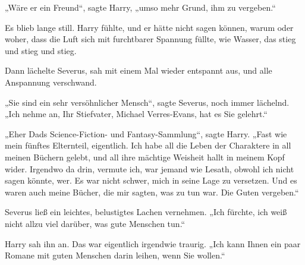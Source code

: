 „Wäre er ein Freund“, sagte Harry, „umso mehr Grund, ihm zu vergeben.“

Es blieb lange still. Harry fühlte, und er hätte nicht sagen können, warum oder woher, dass die Luft sich mit furchtbarer Spannung füllte, wie Wasser, das stieg und stieg und stieg.

Dann lächelte Severus, sah mit einem Mal wieder entspannt aus, und alle Anspannung verschwand.

„Sie sind ein sehr versöhnlicher Mensch“, sagte Severus, noch immer lächelnd.
„Ich nehme an, Ihr Stiefvater, Michael Verres-Evans, hat es Sie gelehrt.“

„Eher Dads Science-Fiction- und Fantasy-Sammlung“, sagte Harry.
„Fast wie mein fünftes Elternteil, eigentlich. Ich habe all die Leben der Charaktere in all meinen Büchern gelebt, und all ihre mächtige Weisheit hallt in meinem Kopf wider. Irgendwo da drin, vermute ich, war jemand wie Lesath, obwohl ich nicht sagen könnte, wer. Es war nicht schwer, mich in seine Lage zu versetzen. Und es waren auch meine Bücher, die mir sagten, was zu tun war. Die Guten vergeben.“

Severus ließ ein leichtes, belustigtes Lachen vernehmen.
„Ich fürchte, ich weiß nicht allzu viel darüber, was gute Menschen tun.“

Harry sah ihn an. Das war eigentlich irgendwie traurig.
„Ich kann Ihnen ein paar Romane mit guten Menschen darin leihen, wenn Sie wollen.“


